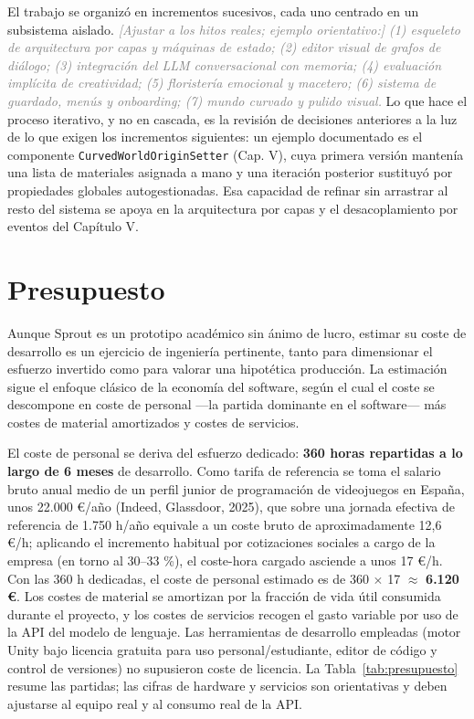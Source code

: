 \documentclass[12pt,twoside,titlepage]{report}
\begin{document}
El trabajo se organizó en incrementos sucesivos, cada uno centrado en un subsistema aislado. \textcolor{gray}{\textit{[Ajustar a los hitos reales; ejemplo orientativo:] (1) esqueleto de arquitectura por capas y máquinas de estado; (2) editor visual de grafos de diálogo; (3) integración del LLM conversacional con memoria; (4) evaluación implícita de creatividad; (5) floristería emocional y macetero; (6) sistema de guardado, menús y onboarding; (7) mundo curvado y pulido visual.}} Lo que hace el proceso iterativo, y no en cascada, es la revisión de decisiones anteriores a la luz de lo que exigen los incrementos siguientes: un ejemplo documentado es el componente \texttt{CurvedWorldOriginSetter} (Cap. V), cuya primera versión mantenía una lista de materiales asignada a mano y una iteración posterior sustituyó por propiedades globales autogestionadas. Esa capacidad de refinar sin arrastrar al resto del sistema se apoya en la arquitectura por capas y el desacoplamiento por eventos del Capítulo V.

\section{Presupuesto}

Aunque Sprout es un prototipo académico sin ánimo de lucro, estimar su coste de desarrollo es un ejercicio de ingeniería pertinente, tanto para dimensionar el esfuerzo invertido como para valorar una hipotética producción. La estimación sigue el enfoque clásico de la economía del software, según el cual el coste se descompone en coste de personal ---la partida dominante en el software--- más costes de material amortizados y costes de servicios.

El coste de personal se deriva del esfuerzo dedicado: \textbf{360 horas repartidas a lo largo de 6 meses} de desarrollo. Como tarifa de referencia se toma el salario bruto anual medio de un perfil junior de programación de videojuegos en España, unos 22.000 €/año (Indeed, Glassdoor, 2025), que sobre una jornada efectiva de referencia de 1.750 h/año equivale a un coste bruto de aproximadamente 12,6 €/h; aplicando el incremento habitual por cotizaciones sociales a cargo de la empresa (en torno al 30--33 \%), el coste-hora cargado asciende a unos 17 €/h. Con las 360 h dedicadas, el coste de personal estimado es de 360 $\times$ 17 $\approx$ \textbf{6.120 €}. Los costes de material se amortizan por la fracción de vida útil consumida durante el proyecto, y los costes de servicios recogen el gasto variable por uso de la API del modelo de lenguaje. Las herramientas de desarrollo empleadas (motor Unity bajo licencia gratuita para uso personal/estudiante, editor de código y control de versiones) no supusieron coste de licencia. La Tabla~\ref{tab:presupuesto} resume las partidas; las cifras de hardware y servicios son orientativas y deben ajustarse al equipo real y al consumo real de la API.
\end{document}
